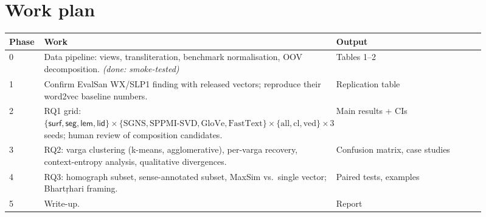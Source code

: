 \documentclass[11pt,a4paper]{article}
\theoremstyle{remark}\newtheorem{remark}{Remark}
\newcommand{\vk}[1]{\textsf{#1}}         %
\begin{document}
\section{Work plan}
\begin{tabular}{p{0.06\linewidth}p{0.55\linewidth}p{0.3\linewidth}}
\toprule
Phase & Work & Output\\
\midrule
0 & Data pipeline: views, transliteration, benchmark normalisation,
OOV decomposition. \emph{(done: smoke-tested)} & Tables 1--2\\
1 & Confirm EvalSan WX/SLP1 finding with released vectors; reproduce their
word2vec baseline numbers. & Replication table\\
2 & RQ1 grid: $\{\vk{surf},\vk{seg},\vk{lem},\vk{lid}\}\times\{\text{SGNS},
\text{SPPMI-SVD},\text{GloVe},\text{FastText}\}\times\{\text{all},\text{cl},
\text{ved}\}\times 3$ seeds; human review of composition candidates. & Main results + CIs\\
3 & RQ2: varga clustering (k-means, agglomerative), per-varga recovery,
context-entropy analysis, qualitative divergences. & Confusion matrix, case
studies\\
4 & RQ3: homograph subset, sense-annotated subset, MaxSim vs.\ single
vector; Bhartṛhari framing. & Paired tests, examples\\
5 & Write-up. & Report\\
\bottomrule
\end{tabular}
\end{document}
